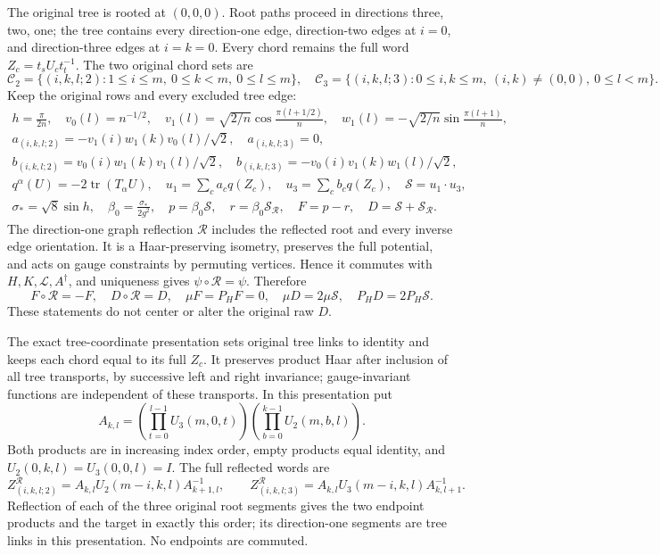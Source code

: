 \documentclass[11pt]{article}
\begin{document}
The original tree is rooted at \((0,0,0)\). Root paths proceed in directions three, two, one; the tree contains every direction-one edge, direction-two edges at \(i=0\), and direction-three edges at \(i=k=0\). Every chord remains the full word \(Z_c=t_sU_ct_t^{-1}\). The two original chord sets are
\[
 \mathcal C_2=\{(i,k,l;2):1\le i\le m,\ 0\le k<m,\ 0\le l\le m\},
 \quad
 \mathcal C_3=\{(i,k,l;3):0\le i,k\le m,\ (i,k)\ne(0,0),\
                                  0\le l<m\}.
 \tag{PRE10}
\]
Keep the original rows and every excluded tree edge:
\[
 \begin{gathered}
 h=\frac{\pi}{2n},\quad
 v_0(l)=n^{-1/2},\quad
 v_1(l)=\sqrt{2/n}\cos\frac{\pi(l+1/2)}n,\quad
 w_1(l)=-\sqrt{2/n}\sin\frac{\pi(l+1)}n,\\
 a_{(i,k,l;2)}=-v_1(i)w_1(k)v_0(l)/\sqrt2,\quad a_{(i,k,l;3)}=0,\\
 b_{(i,k,l;2)}=v_0(i)w_1(k)v_1(l)/\sqrt2,\quad
 b_{(i,k,l;3)}=-v_0(i)v_1(k)w_1(l)/\sqrt2,\\
 q^\alpha(U)=-2\operatorname{tr}(T_\alpha U),\quad
 u_1=\sum_ca_cq(Z_c),\quad u_3=\sum_cb_cq(Z_c),\quad
 \mathcal S=u_1\cdot u_3,\\
 \sigma_*=\sqrt8\sin h,\quad\beta_0=\frac{\sigma_*}{2g^2},\quad
 p=\beta_0\mathcal S,\quad r=\beta_0\mathcal S_{\mathcal R},\quad
 F=p-r,\quad D=\mathcal S+\mathcal S_{\mathcal R}.
 \end{gathered}\tag{PRE11}
\]
The direction-one graph reflection \(\mathcal R\) includes the reflected root and every inverse edge orientation. It is a Haar-preserving isometry, preserves the full potential, and acts on gauge constraints by permuting vertices. Hence it commutes with \(H,K,\mathcal L,A^\dagger\), and uniqueness gives \(\psi\circ\mathcal R=\psi\). Therefore
\[
 F\circ\mathcal R=-F,\quad D\circ\mathcal R=D,\quad
 \mu F=P_HF=0,\quad
 \mu D=2\mu\mathcal S,\quad P_HD=2P_H\mathcal S.
 \tag{PRE12}
\]
These statements do not center or alter the original raw \(D\).

The exact tree-coordinate presentation sets original tree links to identity and keeps each chord equal to its full \(Z_c\). It preserves product Haar after inclusion of all tree transports, by successive left and right invariance; gauge-invariant functions are independent of these transports. In this presentation put
\[
 A_{k,l}=\left(\prod_{t=0}^{l-1}U_3(m,0,t)\right)
          \left(\prod_{b=0}^{k-1}U_2(m,b,l)\right).
 \tag{PRE13}
\]
Both products are in increasing index order, empty products equal identity, and \(U_2(0,k,l)=U_3(0,0,l)=I\). The full reflected words are
\[
 Z^{\mathcal R}_{(i,k,l;2)}
   =A_{k,l}U_2(m-i,k,l)A_{k+1,l}^{-1},\qquad
 Z^{\mathcal R}_{(i,k,l;3)}
   =A_{k,l}U_3(m-i,k,l)A_{k,l+1}^{-1}.
 \tag{PRE14}
\]
Reflection of each of the three original root segments gives the two endpoint products and the target in exactly this order; its direction-one segments are tree links in this presentation. No endpoints are commuted.
\end{document}
